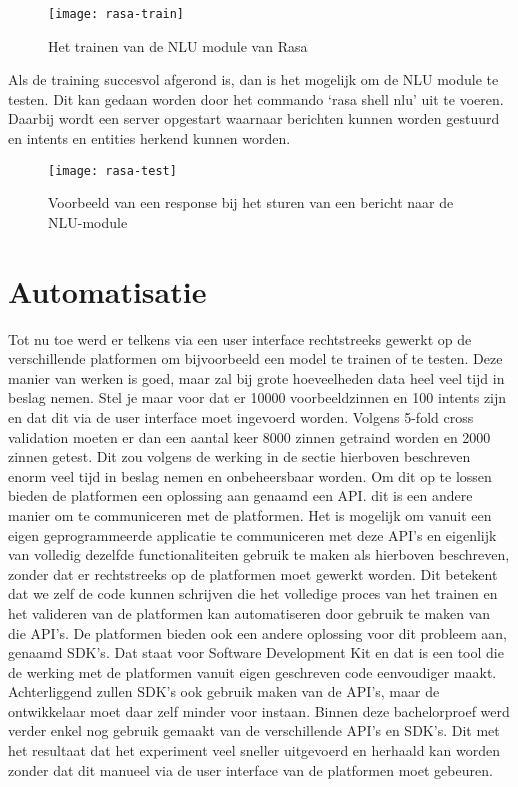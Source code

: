 \begin{figure}[H]
    \label{fig:rasa-train}
    \centering
    \texttt{[image: rasa-train]}
    \caption{Het trainen van de NLU module van Rasa}
\end{figure}

Als de training succesvol afgerond is, dan is het mogelijk om de NLU module te testen. Dit kan gedaan worden door het commando ‘rasa shell nlu’ uit te voeren. Daarbij wordt een server opgestart waarnaar berichten kunnen worden gestuurd en intents en entities herkend kunnen worden. 

\begin{figure}[H]
    \label{fig:rasa-test}
    \centering
    \texttt{[image: rasa-test]}
    \caption{Voorbeeld van een response bij het sturen van een bericht naar de NLU-module}
\end{figure}

\section{Automatisatie}
\label{sec:automatisatie}

Tot nu toe werd er telkens via een user interface rechtstreeks gewerkt op de verschillende platformen om bijvoorbeeld een model te trainen of te testen. Deze manier van werken is goed, maar zal bij grote hoeveelheden data heel veel tijd in beslag nemen. Stel je maar voor dat er 10000 voorbeeldzinnen  en 100 intents zijn en dat dit via de user interface moet ingevoerd worden. Volgens 5-fold cross validation moeten er dan een aantal keer 8000 zinnen getraind worden en 2000 zinnen getest. Dit zou volgens de werking in de sectie hierboven beschreven enorm veel tijd in beslag nemen en onbeheersbaar worden. Om dit op te lossen bieden de platformen een oplossing aan genaamd een API. dit is een andere manier om te communiceren met de platformen. Het is mogelijk om vanuit een eigen geprogrammeerde applicatie te communiceren met deze API’s en eigenlijk van volledig dezelfde functionaliteiten gebruik te maken als hierboven beschreven, zonder dat er rechtstreeks op de platformen moet gewerkt worden. Dit betekent dat we zelf de code kunnen schrijven die het volledige proces van het trainen en het valideren van de platformen kan automatiseren door gebruik te maken van die API’s. De platformen bieden ook een andere oplossing voor dit probleem aan, genaamd SDK's. Dat staat voor Software Development Kit en dat is een tool die de werking met de platformen vanuit eigen geschreven code eenvoudiger maakt. Achterliggend zullen SDK's ook gebruik maken van de API's, maar de ontwikkelaar moet daar zelf minder voor instaan. Binnen deze bachelorproef werd verder enkel nog gebruik gemaakt van de verschillende API’s en SDK's. Dit met het resultaat dat het experiment veel sneller uitgevoerd en herhaald kan worden zonder dat dit manueel via de user interface van de platformen moet gebeuren.

